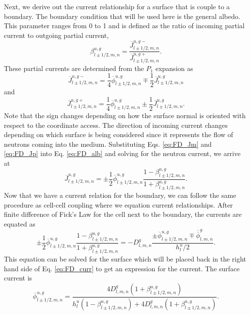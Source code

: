 \documentclass{ansconf}
\numberwithin{equation}{section}
\begin{document}
Next, we derive out the current relationship for a surface that is couple to a boundary. The boundary condition that will be used here is the general albedo. This parameter ranges from 0 to 1 and is defined as the ratio of incoming partial current to outgoing partial current,
\begin{equation}\label{eq:FD_alb}
    \beta_{l\pm1/2,m,n}^{u,g} = \frac{\overline{J}^{u,g-}_{l\pm1/2,m,n}}{\overline{J}^{u,g+}_{l\pm1/2,m,n}}.
\end{equation}
These partial currents are determined from the $P_1$ expansion as
\begin{equation} \label{eq:FD_Jm}
    \overline{J}^{u,g-}_{l\pm1/2,m,n} = \frac{1}{4}\overline{\phi}^{u,g}_{l\pm1/2,m,n} \mp \frac{1}{2} \overline{J}^{u,g}_{l\pm1/2,m,n}
\end{equation}
and
\begin{equation} \label{eq:FD_Jp}
    \overline{J}^{u,g+}_{l\pm1/2,m,n} = \frac{1}{4}\overline{\phi}^{u,g}_{l\pm1/2,m,n} \pm \frac{1}{2} \overline{J}^{u,g}_{l\pm1/2,m,n}.
\end{equation}
Note that the sign changes depending on how the surface normal is oriented with respect to the coordinate access. The direction of incoming current changes depending on which surface is being considered since it represents the flow of neutrons coming into the medium.  Substituting Eqs. \eqref{eq:FD_Jm} and \eqref{eq:FD_Jp} into Eq. \eqref{eq:FD_alb} and solving for the neutron current, we arrive at
\begin{equation}
    \overline{J}^{u,g}_{l\pm1/2,m,n} = \pm \frac{1}{2}\overline{\phi}^{u,g}_{l\pm1/2,m,n}\frac{1-\beta_{l\pm1/2,m,n}^{u,g}}{1+\beta_{l\pm1/2,m,n}^{u,g}}.
\end{equation}
Now that we have a current relation for the boundary, we can follow the same procedure as cell-cell coupling where we equation current relationships. After finite difference of Fick's Law for the cell next to the boundary, the currents are equated as
\begin{equation}\label{eq:FD_curr}
    \pm \frac{1}{2}\overline{\phi}^{u,g}_{l\pm1/2,m,n}\frac{1-\beta_{l\pm1/2,m,n}^{u,g}}{1+\beta_{l\pm1/2,m,n}^{u,g}} = -D_{l,m,n}^{g}\frac{\pm \overline{\phi}^{u,g}_{l\pm1/2,m,n}\mp
\overline{\overline{\phi}}_{l,m,n}^{g}}{h_{l}^{u}/2}.
\end{equation}
This equation can be solved for the surface which will be placed back in the right hand side of Eq. \eqref{eq:FD_curr} to get an expression for the current. The surface current is
\begin{equation}
    \overline{\phi}^{u,g}_{l\pm1/2,m,n} = \frac{4D_{l,m,n}^{g} \left(1+\beta_{l\pm1/2,m,n}^{u,g}\right)}{h_{l}^{u} \left(1-\beta_{l\pm1/2,m,n}^{u,g}\right) + 4D_{l,m,n}^{g} \left(1+\beta_{l\pm1/2,m,n}^{u,g}\right)}.
\end{equation}
\end{document}
